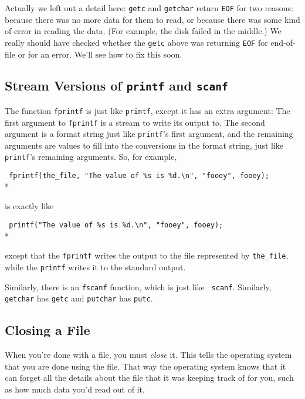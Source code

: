 Actually we left out a detail here:  {\tt getc} and {\tt getchar} return
{\tt EOF} for two reasons:  because there was no more data for them to
read, or because there was some kind of error in reading the data.  (For
example, the disk failed in the middle.)  We really should have checked
whether the {\tt getc} above was returning {\tt EOF} for end-of-file or
for an error.  We'll see how to fix this soon.

\subsection{Stream Versions of {\tt printf} and {\tt scanf}}

The function {\tt fprintf} is just like {\tt printf}, except it has an
extra argument:  The first argument to {\tt fprintf} is a stream to
write its output to.  The second argument is a format string just like
{\tt printf}'s first argument, and the remaining arguments are values to
fill into the conversions in the format string, just like {\tt printf}'s
remaining arguments.  So, for example,

\begin{flushleft}
\verb! fprintf(the_file, "The value of %s is %d.\n", "fooey", fooey); ! \\*
\end{flushleft}

\noindent is exactly like 

\begin{flushleft}
\verb! printf("The value of %s is %d.\n", "fooey", fooey); ! \\*
\end{flushleft}

\noindent except that the {\tt fprintf} writes the output to the file
represented by {\tt the\_file}, while the {\tt printf} writes it to the
standard output.

Similarly, there is an {\tt fscanf} function, which is just like {\tt
scanf}.  Similarly, {\tt getchar} has {\tt getc} and {\tt putchar} has
{\tt putc}.  

\subsection{Closing a File}

When you're done with a file, you must {\em close}\/ it.  This tells the
operating system that you are done using the file.  That way the
operating system knows that it can forget all the details about the file
that it was keeping track of for you, such as how much data you'd read
out of it.  

